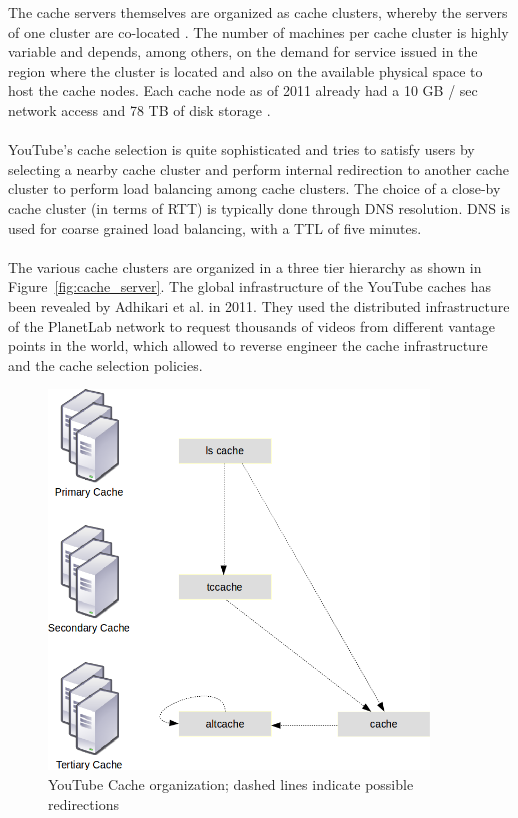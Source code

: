 The cache servers themselves are organized as cache clusters, whereby the servers of one cluster are co-located \cite{inc:video_delivery}. The number of machines per cache cluster is highly variable and depends, among others, on the demand for service issued in the region where the cluster is located and also on the available physical space to host the cache nodes. Each cache node as of 2011 already had a 10 GB / sec network access and 78 TB of disk storage \cite{misc:mmsys_keynote}.
\\
\\
YouTube's cache selection is quite sophisticated and tries to satisfy users by selecting a nearby cache cluster and perform internal redirection to another cache cluster to perform load balancing among cache clusters. The choice of a close-by cache cluster (in terms of RTT) is typically done through DNS resolution. %
DNS is used for coarse grained load balancing, with a TTL of five minutes. 
\\
\\
The various cache clusters are organized in a three tier hierarchy as shown in Figure~\vref{fig:cache_server}. The global infrastructure of the YouTube caches has been revealed by Adhikari et al. \cite{inpr:vivisecting_youtube} in 2011. They used the distributed infrastructure of the PlanetLab network to request thousands of videos from different vantage points in the world, which allowed to reverse engineer the cache infrastructure and the cache selection policies. 

\begin{figure}[htbp]
  \begin{center}
    \includegraphics[width=0.9\textwidth]{pictures/cache_server.png}
    \caption{YouTube Cache organization; dashed lines indicate possible redirections}
    \label{fig:cache_server}
  \end{center}
\end{figure}

